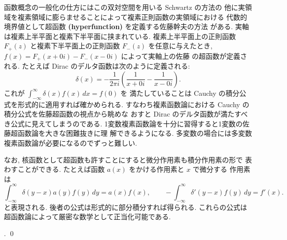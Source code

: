 \documentclass[12pt,twoside]{jarticle}
\begin{document}
\begin{example}[積分作用素]
{    函数概念の一般化の仕方にはこの双対空間を用いる Schwartz の方法の
    他に実領域を複素領域に膨らませることによって複素正則函数の実領域における 
    代数的境界値として超函数 {\bf (hyperfunction)} を定義する佐藤幹夫の方法
    がある.
    実軸は複素上半平面と複素下半平面に挟まれている.
    複素上半平面上の正則函数 $F_+(z)$ と複素下半平面上の正則函数 $F_-(z)$ 
    を任意に与えたとき, $f(x) = F_+(x+0i) - F_-(x-0i)$ によって実軸上の佐藤
    の超函数が定義される.  たとえば Dirac のデルタ函数は次のように定義される:
    \begin{equation*}
      \delta(x) 
      = -\frac{1}{2\pi i} 
      \left(
        \frac{1}{x + 0i} - \frac{1}{x - 0i}
      \right).
    \end{equation*}
    これが $\int_{-\infty}^\infty \delta(x)f(x)\,dx = f(0)$ を
    満たしていることは Cauchy の積分公式を形式的に適用すれば確かめられる.
    すなわち複素函数論における Cauchy の積分公式を佐藤超函数の視点から眺めな
    おすと Dirac のデルタ函数が満たすべき公式に見えてしまうのである.
    1変数複素函数論を十分に習得すると1変数の佐藤超函数論を大きな困難抜きに理
    解できるようになる. 
    多変数の場合には多変数複素函数論が必要になるのでずっと難しい.
    
    なお, 核函数として超函数も許すことにすると微分作用素も積分作用素の形で
    表わすことができる. たとえば函数 $a(x)$ をかける作用素と $x$ で微分する
    作用素は
    \begin{equation*}
      \int_{-\infty}^\infty \delta(y-x)a(y)f(y)\,dy = a(x)f(x),
      \qquad
      -\int_{-\infty}^\infty \delta'(y-x)f(y)\,dy = f'(x).
    \end{equation*}
    と表現される.  後者の公式は形式的に部分積分すれば得られる.  
    これらの公式は超函数論によって厳密な数学として正当化可能である.}.
  \qed
\end{example}

\end{document}
